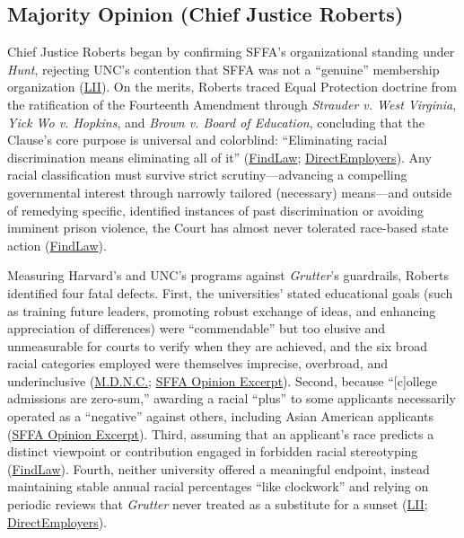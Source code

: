 \documentclass[12pt]{article}
\begin{document}
\subsection{Majority Opinion (Chief Justice Roberts)}

Chief Justice Roberts began by confirming SFFA's organizational standing under \textit{Hunt}, rejecting UNC's contention that SFFA was not a ``genuine'' membership organization (\href{https://www.law.cornell.edu/supremecourt/text/20-1199}{LII}). On the merits, Roberts traced Equal Protection doctrine from the ratification of the Fourteenth Amendment through \textit{Strauder v. West Virginia}, \textit{Yick Wo v. Hopkins}, and \textit{Brown v. Board of Education}, concluding that the Clause's core purpose is universal and colorblind: ``Eliminating racial discrimination means eliminating all of it'' (\href{https://caselaw.findlaw.com/court/us-supreme-court/20-1199.html}{FindLaw}; \href{https://directemployers.org/2023/07/03/scotus-ends-its-45-year-detour-around-the-equal-protection-clause-by-now-finding-race-based-admissions-practices-at-harvard-and-unc-unlawful/}{DirectEmployers}). Any racial classification must survive strict scrutiny---advancing a compelling governmental interest through narrowly tailored (necessary) means---and outside of remedying specific, identified instances of past discrimination or avoiding imminent prison violence, the Court has almost never tolerated race-based state action (\href{https://caselaw.findlaw.com/court/us-supreme-court/20-1199.html}{FindLaw}).

Measuring Harvard's and UNC's programs against \textit{Grutter}'s guardrails, Roberts identified four fatal defects. First, the universities' stated educational goals (such as training future leaders, promoting robust exchange of ideas, and enhancing appreciation of differences) were ``commendable'' but too elusive and unmeasurable for courts to verify when they are achieved, and the six broad racial categories employed were themselves imprecise, overbroad, and underinclusive (\href{https://www.ncmd.uscourts.gov/students-fair-admissions-inc-v-president-fellows-harvard-college}{M.D.N.C.}; \href{https://tikvah.org/wp-content/uploads/2026/05/Students-for-Fair-Admissions.pdf}{SFFA Opinion Excerpt}). Second, because ``[c]ollege admissions are zero-sum,'' awarding a racial ``plus'' to some applicants necessarily operated as a ``negative'' against others, including Asian American applicants (\href{https://tikvah.org/wp-content/uploads/2026/05/Students-for-Fair-Admissions.pdf}{SFFA Opinion Excerpt}). Third, assuming that an applicant's race predicts a distinct viewpoint or contribution engaged in forbidden racial stereotyping (\href{https://caselaw.findlaw.com/court/us-supreme-court/20-1199.html}{FindLaw}). Fourth, neither university offered a meaningful endpoint, instead maintaining stable annual racial percentages ``like clockwork'' and relying on periodic reviews that \textit{Grutter} never treated as a substitute for a sunset (\href{https://www.law.cornell.edu/supremecourt/text/20-1199}{LII}; \href{https://directemployers.org/2023/07/03/scotus-ends-its-45-year-detour-around-the-equal-protection-clause-by-now-finding-race-based-admissions-practices-at-harvard-and-unc-unlawful/}{DirectEmployers}).
\end{document}
